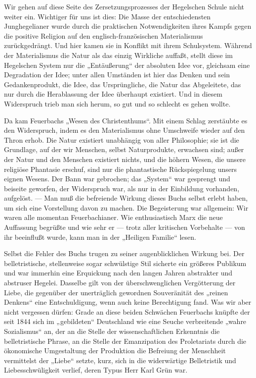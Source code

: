 Wir gehen auf diese Seite des Zersetzungsprozesses der Hegelschen
Schule nicht weiter ein. Wichtiger für uns ist dies: Die Masse der
entschiedensten Junghegelianer wurde durch die praktischen
Notwendigkeiten ihres Kampfs gegen die positive Religion auf den
englisch-französischen Materialismus zurückgedrängt. Und hier kamen sie
in Konflikt mit ihrem Schulsystem. Während der Materialismus die Natur
als das einzig Wirkliche auffaßt, stellt diese im Hegelschen System nur
die „Entäußerung`` der absoluten Idee vor, gleichsam eine Degradation der
Idee; unter allen Umständen ist hier das Denken und sein
Gedankenprodukt, die Idee, das Ursprüngliche, die Natur das Abgeleitete,
das nur durch die Herablassung der Idee überhaupt existiert. Und in
diesem Widerspruch trieb man sich herum, so gut und so schlecht es gehen
wollte.

Da kam Feuerbachs „Wesen des Christenthums``. Mit einem Schlag
zerstäubte es den Widerspruch, indem es den Materialismus ohne
Umschweife wieder auf den Thron erhob. Die Natur existiert unabhängig
von aller Philosophie; sie ist die Grundlage, auf der wir Menschen,
selbst Naturprodukte, erwachsen sind; außer der Natur und den Menschen
existiert nichts, und die höhern Wesen, die unsere religiöse Phantasie
erschuf, sind nur die phantastische Rückspiegelung unsers eignen Wesens.
Der Bann war gebrochen; das „System`` war gesprengt und beiseite
geworfen, der Widerspruch war, als nur in der Einbildung vorhanden,
aufgelöst. --- Man muß die befreiende Wirkung dieses Buchs selbst erlebt
haben, um sich eine Vorstellung davon zu machen. Die Begeisterung war
allgemein: Wir waren alle momentan Feuerbachianer. Wie enthusiastisch
Marx die neue Auffassung begrüßte \textbar{} und wie sehr er --- trotz aller
kritischen Vorbehalte --- von ihr beeinflußt wurde, \textbar{} kann man in
der „Heiligen Familie`` lesen.

Selbst die Fehler des Buchs trugen zu seiner augenblicklichen
Wirkung bei. Der belletristische, stellenweise sogar schwülstige Stil
sicherte ein größeres Publikum und war immerhin eine Erquickung nach den
langen Jahren abstrakter und abstruser Hegelei. Dasselbe gilt von der
überschwenglichen Vergötterung der Liebe, die gegenüber der unerträglich
gewordnen Souveränität des „reinen Denkens`` eine Entschuldigung, wenn
auch keine Berechtigung fand. Was wir aber nicht vergessen dürfen: Grade
an diese beiden Schwächen Feuerbachs knüpfte der seit 1844 sich im
„gebildeten`` Deutschland wie eine Seuche verbreitende „wahre
Sozialismus`` an, der an die Stelle der wissenschaftlichen Erkenntnis die
belletristische Phrase, an die Stelle der Emanzipation des Proletariats
durch die ökonomische Umgestaltung der Produktion die Befreiung der
Menschheit vermittelst der „Liebe`` setzte, kurz, sich in die
widerwärtige Belletristik und Liebesschwüligkeit verlief, deren Typus
Herr Karl Grün war.

